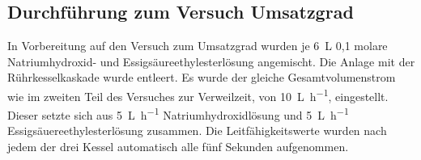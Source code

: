 \subsection{Durchführung zum Versuch Umsatzgrad}

In Vorbereitung auf den Versuch zum Umsatzgrad wurden je \SI{6}{\liter} 0,1 molare Natriumhydroxid- und Essigsäureethylesterlösung angemischt. Die Anlage mit der Rührkesselkaskade wurde entleert. Es wurde der gleiche Gesamtvolumenstrom wie im zweiten Teil des Versuches zur Verweilzeit, von \SI{10}{\liter\per\hour}, eingestellt. Dieser setzte sich aus \SI{5}{\liter\per\hour} Natriumhydroxidlösung und \SI{5}{\liter\per\hour} Essigsäuereethylesterlösung zusammen. Die Leitfähigkeitswerte wurden nach jedem der drei Kessel automatisch alle fünf Sekunden aufgenommen.




